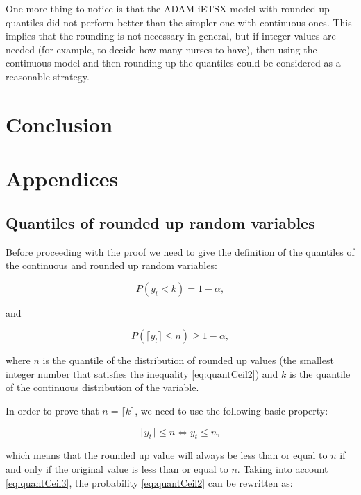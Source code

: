 \documentclass[]{elsarticle} %
\begin{document}
One more thing to notice is that the ADAM-iETSX model with rounded up quantiles did not perform better than the simpler one with continuous ones. This implies that the rounding is not necessary in general, but if integer values are needed (for example, to decide how many nurses to have), then using the continuous model and then rounding up the quantiles could be considered as a reasonable strategy.

\hypertarget{conclusion}{%
\section{Conclusion}\label{conclusion}}

\hypertarget{appendices}{%
\section{Appendices}\label{appendices}}

\hypertarget{quantiles_ceiling}{%
\subsection{Quantiles of rounded up random variables}\label{quantiles_ceiling}}

Before proceeding with the proof we need to give the definition of the quantiles of the continuous and rounded up random variables:

\begin{equation} \label{eq:quantCeil1}
    P \left(y_t < k \right) = 1 - \alpha ,
\end{equation}

and

\begin{equation} \label{eq:quantCeil2}
    P \left(\lceil y_t \rceil \leq n \right) \geq 1 - \alpha ,
\end{equation}

where \(n\) is the quantile of the distribution of rounded up values (the smallest integer number that satisfies the inequality \eqref{eq:quantCeil2}) and \(k\) is the quantile of the continuous distribution of the variable.

In order to prove that \(n = \lceil k \rceil\), we need to use the following basic property:

\begin{equation} \label{eq:quantCeil3}
    \lceil y_t \rceil \leq n \iff  y_t \leq n,
\end{equation}

which means that the rounded up value will always be less than or equal to \(n\) if and only if the original value is less than or equal to \(n\). Taking into account \eqref{eq:quantCeil3}, the probability \eqref{eq:quantCeil2} can be rewritten as:
\end{document}
